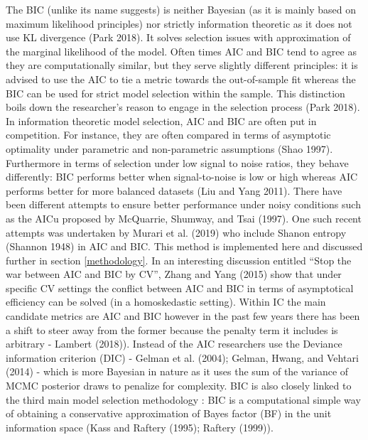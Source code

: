 \documentclass[12pt,]{article}
\begin{document}
The BIC (unlike its name suggests) is neither Bayesian (as it is mainly based on maximum likelihood principles) nor strictly information theoretic as it does not use KL divergence (Park 2018). It solves selection issues with approximation of the marginal likelihood of the model. Often times AIC and BIC tend to agree as they are computationally similar, but they serve slightly different principles: it is advised to use the AIC to tie a metric towards the out-of-sample fit whereas the BIC can be used for strict model selection within the sample. This distinction boils down the researcher's reason to engage in the selection process (Park 2018). In information theoretic model selection, AIC and BIC are often put in competition. For instance, they are often compared in terms of asymptotic optimality under parametric and non-parametric assumptions (Shao 1997). Furthermore in terms of selection under low signal to noise ratios, they behave differently: BIC performs better when signal-to-noise is low or high whereas AIC performs better for more balanced datasets (Liu and Yang 2011). There have been different attempts to ensure better performance under noisy conditions such as the AICu proposed by McQuarrie, Shumway, and Tsai (1997). One such recent attempts was undertaken by Murari et al. (2019) who include Shanon entropy (Shannon 1948) in AIC and BIC. This method is implemented here and discussed further in section \ref{methodology}. In an interesting discussion entitled ``Stop the war between AIC and BIC by CV'', Zhang and Yang (2015) show that under specific CV settings the conflict between AIC and BIC in terms of asymptotical efficiency can be solved (in a homoskedastic setting). Within IC the main candidate metrics are AIC and BIC however in the past few years there has been a shift to steer away from the former because the penalty term it includes is arbitrary - Lambert (2018)). Instead of the AIC researchers use the Deviance information criterion (DIC) - Gelman et al. (2004); Gelman, Hwang, and Vehtari (2014) - which is more Bayesian in nature as it uses the sum of the variance of MCMC posterior draws to penalize for complexity.
BIC is also closely linked to the third main model selection methodology : BIC is a computational simple way of obtaining a conservative approximation of Bayes factor (BF) in the unit information space (Kass and Raftery (1995); Raftery (1999)).
\end{document}
